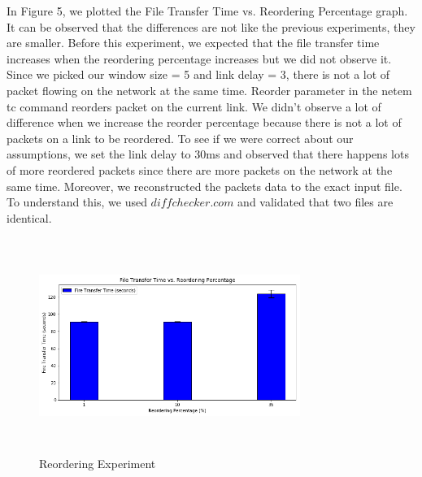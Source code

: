 \documentclass[conference]{IEEEtran}
\begin{document}
\par In Figure 5, we plotted the File Transfer Time vs. Reordering Percentage graph. It can be observed that the differences are not like the previous experiments, they are smaller. Before this experiment, we expected that the file transfer time increases when the reordering percentage increases but we did not observe it. Since we picked our window size = 5 and link delay = 3, there is not a lot of packet flowing on the network at the same time. Reorder parameter in the netem tc command reorders packet on the current link. We didn't observe a lot of difference when we increase the reorder percentage because there is not a lot of packets on a link to be reordered. To see if we were correct about our assumptions, we set the link delay to 30ms and observed that there happens lots of more reordered packets since there are more packets on the network at the same time. Moreover, we reconstructed the packets data to the exact input file. To understand this, we used $diffchecker.com$ and validated that two files are identical.
\begin{figure}[t]
\includegraphics[width=8.5cm, height=7cm]{experiment-reorder.png}
 \caption{Reordering Experiment}
 \label{fig:1}
\end{figure}
\end{document}
